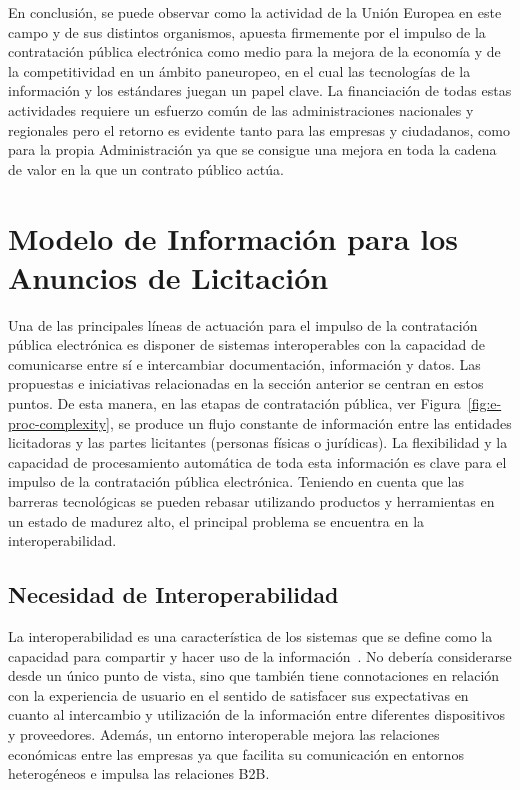 En conclusión, se puede observar como la actividad de la Unión Europea en este campo y de sus distintos organismos, 
apuesta firmemente por el impulso de la contratación pública electrónica como medio para la mejora de la economía
y de la competitividad en un ámbito paneuropeo, en el cual las tecnologías de la información y los estándares 
juegan un papel clave. La financiación de todas estas actividades requiere un esfuerzo común de las administraciones
nacionales y regionales pero el retorno es evidente tanto para las empresas y ciudadanos, como para la propia
Administración ya que se consigue una mejora en toda la cadena de valor en la que un contrato público actúa.

\section{Modelo de Información para los Anuncios de Licitación}
Una de las principales líneas de actuación para el impulso de la contratación
pública electrónica es disponer de sistemas interoperables con la capacidad de
comunicarse entre sí e intercambiar documentación, información y datos. Las propuestas
e iniciativas relacionadas en la sección anterior se centran en estos puntos. De
esta manera, en las etapas de contratación pública, ver Figura~\ref{fig:e-proc-complexity}, se produce un flujo constante de información entre las entidades
licitadoras y las partes licitantes (personas físicas o jurídicas). La flexibilidad y la capacidad
de procesamiento automática de toda esta información es clave para el impulso de la contratación
pública electrónica. Teniendo en cuenta que las barreras tecnológicas se pueden rebasar utilizando
productos y herramientas en un estado de madurez alto, el principal problema se encuentra en la interoperabilidad.

\subsection{Necesidad de Interoperabilidad}
La interoperabilidad es una característica de los sistemas que se define como la capacidad para compartir y hacer uso de la
información~\cite{interoperability}. No debería considerarse desde un único punto de vista, 
sino que también tiene connotaciones en relación con la experiencia de usuario en el
sentido de satisfacer sus expectativas en cuanto al intercambio y utilización de la información entre diferentes dispositivos y proveedores.
Además, un entorno interoperable mejora las relaciones económicas entre las
empresas ya que facilita su comunicación en entornos heterogéneos e impulsa las
relaciones \gls{B2B}.

